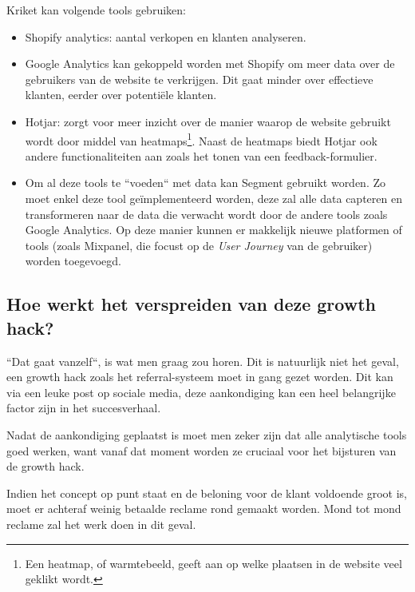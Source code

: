 Kriket kan volgende tools gebruiken:
\begin{itemize}
	\item Shopify analytics: aantal verkopen en klanten analyseren.
	\item Google Analytics kan gekoppeld worden met Shopify om meer data over de gebruikers van de website te verkrijgen. Dit gaat minder over effectieve klanten, eerder over potentiële klanten.
	\item Hotjar: zorgt voor meer inzicht over de manier waarop de website gebruikt wordt door middel van heatmaps\footnote{Een heatmap, of warmtebeeld, geeft aan op welke plaatsen in de website veel geklikt wordt.}. Naast de heatmaps biedt Hotjar ook andere functionaliteiten aan zoals het tonen van een feedback-formulier.
	\item Om al deze tools te ``voeden`` met data kan Segment gebruikt worden. Zo moet enkel deze tool geïmplementeerd worden, deze zal alle data capteren en transformeren naar de data die verwacht wordt door de andere tools zoals Google Analytics. Op deze manier kunnen er makkelijk nieuwe platformen of tools (zoals Mixpanel, die focust op de \emph{User Journey} van de gebruiker) worden toegevoegd.
\end{itemize}

\subsection{Hoe werkt het verspreiden van deze growth hack?}
\label{subsec:growth-hack-verspreiden}
``Dat gaat vanzelf\text{!}``, is wat men graag zou horen. Dit is natuurlijk niet het geval, een growth hack zoals het referral-systeem moet in gang gezet worden. Dit kan via een leuke post op sociale media, deze aankondiging kan een heel belangrijke factor zijn in het succesverhaal. 

Nadat de aankondiging geplaatst is moet men zeker zijn dat alle analytische tools goed werken, want vanaf dat moment worden ze cruciaal voor het bijsturen van de growth hack.

Indien het concept op punt staat en de beloning voor de klant voldoende groot is, moet er achteraf weinig betaalde reclame rond gemaakt worden. Mond tot mond reclame zal het werk doen in dit geval. 

